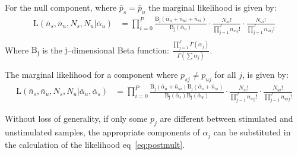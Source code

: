 \documentclass[11pt]{article}
\begin{document}
For the null component, where $\bar{p}_{s}=\bar{p}_{u}$ the marginal likelihood is given by: 
\begin{align}
\mathrm{L}(\bar{n}_s,\bar{n}_u,N_s,N_u|\bar{\alpha}_u) &= \prod_{i=0}^P\frac{ \mathrm{B_j}(\bar{\alpha}_{u}+\bar{n}_{ui}+\bar{n}_{si})}{\mathrm{B_j}(\bar{\alpha}_u)} \cdot \frac{N_{si}!}{\prod_{j=1}^J n_{sij}!} \cdot \frac{N_{ui}!}{\prod_{j=1}^J n_{uij}!}\\
\end{align}
Where $\mathrm{B_j}$ is the $\mathrm{j}$--dimensional Beta function: $\frac{\prod_{j=1}^J\Gamma(\alpha_j)}{\Gamma(\sum\alpha_j)}$.

The marginal likelihood for a component where $p_{sj} \ne p_{uj}$ for all $j$, is given by:
\begin{align}
\mathrm{L}(\bar{n}_s,\bar{n}_u,N_s,N_u|\bar{\alpha}_u,\bar{\alpha}_s) &= \prod_{i=0}^P\frac{  \mathrm{B_j}(\bar{\alpha}_{u}+\bar{n}_{ui}) \mathrm{B_j}(\bar{\alpha}_{s}+\bar{n}_{si})}{\mathrm{B_j}(\bar{\alpha}_s)\mathrm{B_j}(\bar{\alpha}_u)} \cdot \frac{N_{si}!}{\prod_{j=1}^J n_{sij}!} \cdot \frac{N_{ui}!}{\prod_{j=1}^J n_{uij}!}\label{eq:postmult}
\end{align}

Without loss of generality, if only some $p_j$ are different between stimulated and unstimulated samples, the appropriate components of $\alpha_j$  can be substituted in the calculation of the likelihood eq~\eqref{eq:postmult}.
\end{document}
